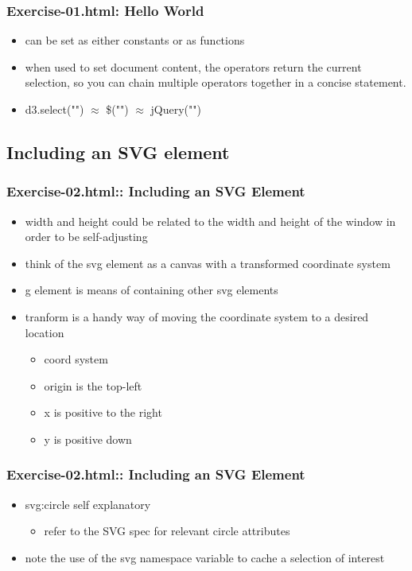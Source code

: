 \documentclass{beamer}
\begin{document}
\begin{frame}
    \frametitle{Exercise-01.html: Hello World}
    \begin{itemize}
    \item can be set as either constants or as functions
    \item when used to set document content, the operators return the current selection, so you can chain multiple operators together in a concise statement.
    \item d3.select("") $\approx$ \$("") $\approx$ jQuery("")
    \end{itemize}
\end{frame}




\subsection{Including an SVG element}

\begin{frame}
    \frametitle{Exercise-02.html:: Including an SVG Element}
    \begin{itemize}
    \item width and height could be related to the width and height of the window in order to be self-adjusting
    \item think of the svg element as a canvas with a transformed coordinate system
    \item g element is means of containing other svg elements
    \item tranform is a handy way of moving the coordinate system to a desired location
        \begin{itemize}
        \item coord system
        \item origin is the top-left
        \item x is positive to the right
        \item y is positive down
        \end{itemize}
    \end{itemize}
\end{frame}


\begin{frame}
    \frametitle{Exercise-02.html:: Including an SVG Element}
    \begin{itemize}
    \item svg:circle self explanatory
        \begin{itemize}
        \item refer to the SVG spec for relevant circle attributes
        \end{itemize}
    \item note the use of the svg namespace variable to cache a selection of interest
    \end{itemize}
\end{frame}
\end{document}
